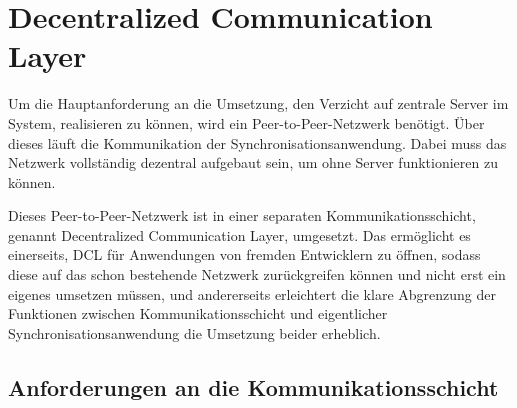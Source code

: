 \chapter{Decentralized Communication Layer}
\renewcommand{\kapitelautor}{Autor: Martin Exner}

Um die Hauptanforderung an die Umsetzung, den Verzicht auf zentrale Server im System, realisieren zu können,
wird ein Peer-to-Peer-Netzwerk benötigt. Über dieses läuft die Kommunikation der Synchronisationsanwendung.
Dabei muss das Netzwerk vollständig dezentral aufgebaut sein, um ohne Server funktionieren zu können.

Dieses Peer-to-Peer-Netzwerk ist in einer separaten Kommunikationsschicht, genannt Decentralized Communication Layer, umgesetzt.
Das ermöglicht es einerseits, DCL für Anwendungen von fremden Entwicklern zu öffnen, sodass diese auf das schon bestehende Netzwerk
zurückgreifen können und nicht erst ein eigenes umsetzen müssen, und andererseits erleichtert die klare Abgrenzung der Funktionen
zwischen Kommunikationsschicht und eigentlicher Synchronisationsanwendung die Umsetzung beider erheblich.

\section{Anforderungen an die Kommunikationsschicht}
